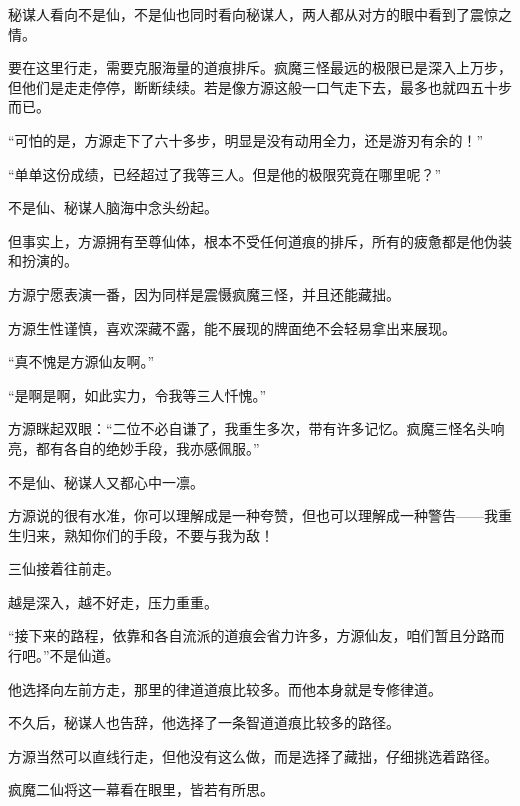\begin{this_body}
秘谋人看向不是仙，不是仙也同时看向秘谋人，两人都从对方的眼中看到了震惊之情。

要在这里行走，需要克服海量的道痕排斥。疯魔三怪最远的极限已是深入上万步，但他们是走走停停，断断续续。若是像方源这般一口气走下去，最多也就四五十步而已。

“可怕的是，方源走下了六十多步，明显是没有动用全力，还是游刃有余的！”

“单单这份成绩，已经超过了我等三人。但是他的极限究竟在哪里呢？”

不是仙、秘谋人脑海中念头纷起。

但事实上，方源拥有至尊仙体，根本不受任何道痕的排斥，所有的疲惫都是他伪装和扮演的。

方源宁愿表演一番，因为同样是震慑疯魔三怪，并且还能藏拙。

方源生性谨慎，喜欢深藏不露，能不展现的牌面绝不会轻易拿出来展现。

“真不愧是方源仙友啊。”

“是啊是啊，如此实力，令我等三人忏愧。”

方源眯起双眼：“二位不必自谦了，我重生多次，带有许多记忆。疯魔三怪名头响亮，都有各自的绝妙手段，我亦感佩服。”

不是仙、秘谋人又都心中一凛。

方源说的很有水准，你可以理解成是一种夸赞，但也可以理解成一种警告——我重生归来，熟知你们的手段，不要与我为敌！

三仙接着往前走。

越是深入，越不好走，压力重重。

“接下来的路程，依靠和各自流派的道痕会省力许多，方源仙友，咱们暂且分路而行吧。”不是仙道。

他选择向左前方走，那里的律道道痕比较多。而他本身就是专修律道。

不久后，秘谋人也告辞，他选择了一条智道道痕比较多的路径。

方源当然可以直线行走，但他没有这么做，而是选择了藏拙，仔细挑选着路径。

疯魔二仙将这一幕看在眼里，皆若有所思。

\end{this_body}


